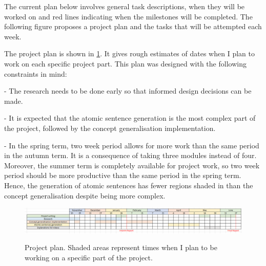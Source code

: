 \begin{landscape}

The current plan below involves general task descriptions, when they will be worked on and red lines indicating when the milestones will be completed. 
The following figure proposes a project plan and the tasks that will be attempted each week.

The project plan is shown in \ref{project-plan}. It gives rough estimates of dates when I plan to work on each specific project part.
This plan was designed with the following constraints in mind:

 - The research needs to be done early so that informed design decisions can be made.
 
 - It is expected that the atomic sentence generation is the most complex part of the project, followed by the concept generalisation implementation.
 
 - In the spring term, two week period allows for more work than the same period in the autumn term. 
 It is a consequence of taking three modules instead of four.
 Moreover, the summer term is completely available for project work, so two week period should be more productive than the same period in the spring term. Hence, the generation of atomic sentences has fewer regions shaded in than the concept generalisation despite being more complex.
 

\begin{figure}[h]
\caption{Project plan. Shaded areas represent times when I plan to be working on a specific part of the project.}
\centering
\includegraphics[width=1.6\textwidth]{project/project plan.PNG}
\label{project-plan}
\end{figure}


\end{landscape}